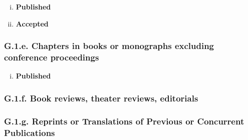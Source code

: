 \documentclass[12pt]{article}
\begin{document}
\begin{enumerate}[i)]
\item  {\bf Published} %

\item  {\bf Accepted} %
\end{enumerate}

\subsubsection*{G.1.e. Chapters in books or monographs excluding conference proceedings}

\begin{enumerate}[i)]
\item {\bf Published} %
\end{enumerate}


\subsubsection*{G.1.f. Book reviews, theater reviews, editorials}

\subsubsection*{G.1.g. Reprints or Translations of Previous or Concurrent Publications}
\end{document}
